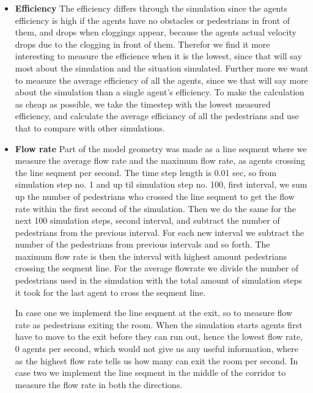 \begin{itemize}
    \item \textbf{Efficiency} The efficiency differs through the simulation since the
	    agents efficiency is high if the agents have no obstacles or pedestrians in front of them,
	    and drops when cloggings appear, because the agents actual velocity
	    drops due to the clogging in front of them.
	    Therefor we find it more interesting to measure the efficience when it is the lowest,
	    since that will say most about the simulation and the situation simulated.
	    Further more we want to measure the average efficiency of all the agents,
	    since we that will say more about the simulation than a single agent's efficiency.
	    To make the calculation as cheap as possible, we take the timestep with the lowest	
	    measured efficiency, and calculate the average efficiancy of all the pedestrians
	    and use that to compare with other simulations.

    \item \textbf{Flow rate} Part of the model geometry was made as a line seqment where we measure the average
	    flow rate and the maximum flow rate, as agents crossing the line seqment per second.
	    The time step length is 0.01 sec, so from simulation step no. 1 and up til simulation step no. 100, first interval, we sum up
	    the number of pedestrians who crossed the line seqment to get the flow rate within the first second of the simulation.
	    Then we do the same for the next 100 simulation steps, second interval, and subtract the number of pedestrians from the previous
	    interval. For each new interval we subtract the number of the pedestrians from previous intervals and so forth.
	    The maximum flow rate is then the interval with highest amount pedestrians crossing the seqment line.
	    For the average flowrate we divide the number of pedestrians used in the simulation with the total amount of simulation steps
	    it took for the last agent to cross the seqment line.

	    In case one we implement the line seqment at the exit, so to measure flow rate as pedestrians exiting the room.
	    When the simulation starts agents first have to move to the exit before they can run out,
	    hence the lowest flow rate, 0 agents per second,
	    which would not give us any useful information, where as the highest flow rate tells us how many can exit the room per second.
	    In case two we implement the line seqment in the middle of the corridor to measure the flow rate in both the directions.


\end{itemize}
